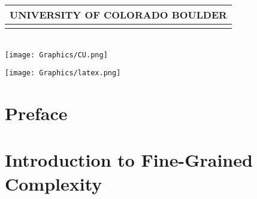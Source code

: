 \documentclass[oneside]{book}
\begin{document}
\begin{center} 
    \begin{minipage}{\textwidth}
        \maketitle
        \begin{center}
        \begin{tabular}{c}
            UNIVERSITY OF COLORADO BOULDER \\
            \hline \\
        \end{tabular}
        \\
        \texttt{[image: Graphics/CU.png]}
        \end{center}
    \end{minipage}
\end{center}

\vfill
{}
\frontmatter

\begin{center}
    \texttt{[image: Graphics/latex.png]}
\end{center}

\pagebreak

\tableofcontents

\setcounter{tocdepth}{4}
\setcounter{secnumdepth}{4}

\pagebreak

\chapter*{Preface}



\mainmatter

\begin{savequote}
    
\end{savequote}
\chapter{Introduction to Fine-Grained Complexity}



\chapter*{}
\end{document}
